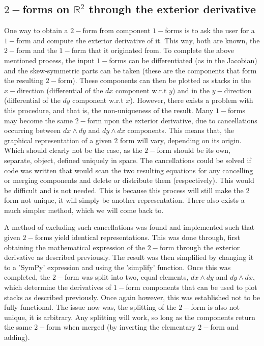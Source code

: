 \documentclass[12pt]{report}
\begin{document}
\subsection{$2-$forms on $\mathbb{R}^2$ through the exterior derivative}
One way to obtain a $2-$form from component $1-$forms is to ask the user for a $1-$form and compute the exterior derivative of it. This way, both are known, the $2-$form and the $1-$form that it originated from. To complete the above mentioned process, the input $1-$forms can be differentiated (as in the Jacobian) and the skew-symmetric parts can be taken (these are the components that form the resulting $2-$form). These components can then be plotted as stacks in the $x-$direction (differential of the $dx$ component w.r.t $y$) and in the $y-$direction (differential of the $dy$ component w.r.t $x$). However, there exists a problem with this procedure, and that is, the non-uniqueness of the result. Many $1-$forms may become the same $2-$form upon the exterior derivative, due to cancellations occurring between $dx \wedge dy$ and $dy\wedge dx$ components.  This means that, the graphical representation of a given 2 form will vary, depending on its origin. Which should clearly not be the case, as the $2-$form should be its own, separate, object, defined uniquely in space.
The cancellations could be solved if code was written that would scan the two resulting equations for any cancelling or merging components and delete or distribute them (respectively). This would be difficult and is not needed. This is because this process will still make the 2 form not unique, it will simply be another representation. There also exists a much simpler method, which we will come back to.

A method of excluding such cancellations was found and implemented such that given $2-$forms yield identical representations. This was done through, first obtaining the mathematical expression of the $2-$form through the exterior derivative as described previously. The result was then simplified by changing it to a 'SymPy' expression and using the 'simplify' function. Once this was completed, the $2-$form was split into two, equal elements, $dx \wedge dy$ and $dy\wedge dx$, which determine the derivatives of $1-$form components that can be used to plot stacks as described previously.
Once again however, this was established not to be fully functional. The issue now was, the splitting of the $2-$form is also not unique, it is arbitrary. Any splitting will work, so long as the components return the same $2-$form when merged (by inverting the elementary $2-$form and adding).
\end{document}
